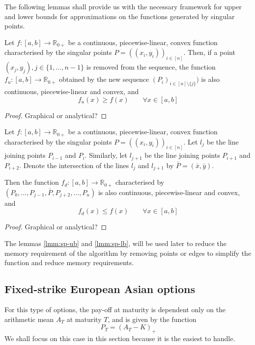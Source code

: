 The following lemmas shall provide us with the necessary framework for upper and lower bounds for approximations on the functions generated by singular points.

\begin{lmm}
	\label{lmm:sp-ub}
	Let $ f:[a,b] \to \mathbb{R}_{0+} $ be a continuous, piecewise-linear, convex function characterised by the singular points $ P = ( (x_i, y_i) )_{i \in [n]} $. Then, if a point $ (x_j, y_j), j \in \{ 1, \dots, n-1\} $ is removed from the sequence, the function $ f_u: [a,b] \to \mathbb{R}_{0+} $ obtained by the new sequence $ (P_i)_{i \in [n] \setminus \{ j \}}) $ is also continuous, piecewise-linear and convex, and
	\begin{equation}
	f_u(x) \geq f(x) \qquad \forall x \in [a,b]
	\end{equation}
\end{lmm}

\begin{proof}
	Graphical or analytical?
\end{proof}

\begin{lmm}
	\label{lmm:sp-lb}
	Let $ f:[a,b] \to \mathbb{R}_{0+} $ be a continuous, piecewise-linear, convex function characterised by the singular points $ P = ( (x_i, y_i) )_{i \in [n]} $. Let $ l_{j} $ be the line joining points $ P_{i-1} $ and $ P_{i} $. Similarly, let $ l_{j+1} $ be the line joining points $ P_{i+1} $ and $ P_{i+2} $. Denote the intersection of the lines $ l_{j} $ and $ l_{j+1} $ by $ \bar{P} = ( \bar{x}, \bar{y} ) $.

	Then the function $ f_d: [a,b] \to \mathbb{R}_{0+} $ characterised by $ (P_0, \dots, P_{j-1}, \bar{P}, P_{j+2}, \dots, P_n) $ is also continuous, piecewise-linear and convex, and
	\begin{equation}
	f_d(x) \leq f(x) \qquad \forall x \in [a,b]
	\end{equation}
\end{lmm}
\begin{proof}
	Graphical or analytical?
\end{proof}

The lemmas \ref{lmm:sp-ub} and \ref{lmm:sp-lb}, will be used later to reduce the memory requirement of the algorithm by removing points or edges to simplify the function and reduce memory requirements.



\subsection{Fixed-strike European Asian options}
For this type of options, the pay-off at maturity is dependent only on the arithmetic mean  $ A_T $ at maturity $T$, and is given by the function
\begin{equation} \label{eq:sp-price-eu-asian-am}
	P_T = (A_T - K)_+
\end{equation}
We shall focus on this case in this section because it is the easiest to handle.

